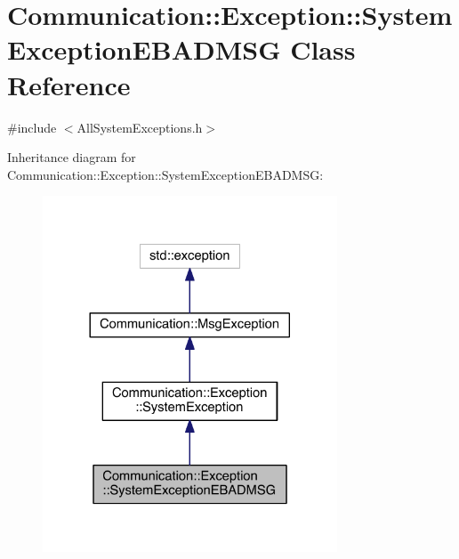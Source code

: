 \hypertarget{class_communication_1_1_exception_1_1_system_exception_e_b_a_d_m_s_g}{}\section{Communication\+:\+:Exception\+:\+:System\+Exception\+E\+B\+A\+D\+M\+S\+G Class Reference}
\label{class_communication_1_1_exception_1_1_system_exception_e_b_a_d_m_s_g}


{\ttfamily \#include $<$All\+System\+Exceptions.\+h$>$}



Inheritance diagram for Communication\+:\+:Exception\+:\+:System\+Exception\+E\+B\+A\+D\+M\+S\+G\+:\nopagebreak
\begin{figure}[H]
\begin{center}
\leavevmode
\includegraphics[width=248pt]{class_communication_1_1_exception_1_1_system_exception_e_b_a_d_m_s_g__inherit__graph}
\end{center}
\end{figure}


